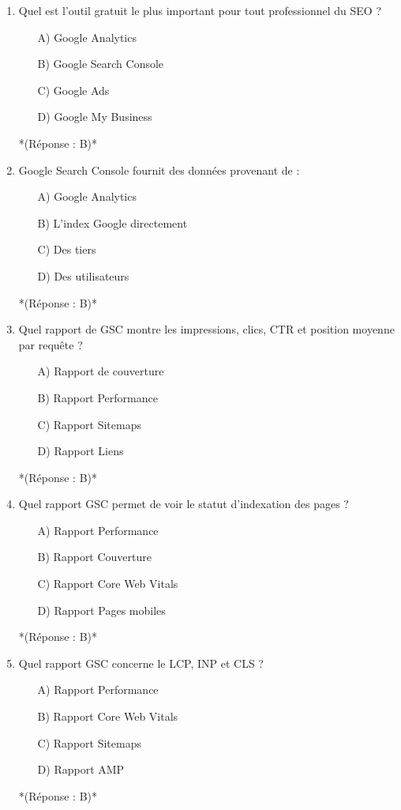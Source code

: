 \documentclass[12pt,a4paper,twoside]{report}
\begin{document}
\begin{enumerate}
    \item Quel est l'outil gratuit le plus important pour tout professionnel du SEO ?
    \begin{itemize}
        \item[A)] Google Analytics
        \item[B)] Google Search Console
        \item[C)] Google Ads
        \item[D)] Google My Business
    \end{itemize}
    *(Réponse : B)*

    \item Google Search Console fournit des données provenant de :
    \begin{itemize}
        \item[A)] Google Analytics
        \item[B)] L'index Google directement
        \item[C)] Des tiers
        \item[D)] Des utilisateurs
    \end{itemize}
    *(Réponse : B)*

    \item Quel rapport de GSC montre les impressions, clics, CTR et position moyenne par requête ?
    \begin{itemize}
        \item[A)] Rapport de couverture
        \item[B)] Rapport Performance
        \item[C)] Rapport Sitemaps
        \item[D)] Rapport Liens
    \end{itemize}
    *(Réponse : B)*

    \item Quel rapport GSC permet de voir le statut d'indexation des pages ?
    \begin{itemize}
        \item[A)] Rapport Performance
        \item[B)] Rapport Couverture
        \item[C)] Rapport Core Web Vitals
        \item[D)] Rapport Pages mobiles
    \end{itemize}
    *(Réponse : B)*

    \item Quel rapport GSC concerne le LCP, INP et CLS ?
    \begin{itemize}
        \item[A)] Rapport Performance
        \item[B)] Rapport Core Web Vitals
        \item[C)] Rapport Sitemaps
        \item[D)] Rapport AMP
    \end{itemize}
    *(Réponse : B)*


\end{enumerate}
\end{document}
